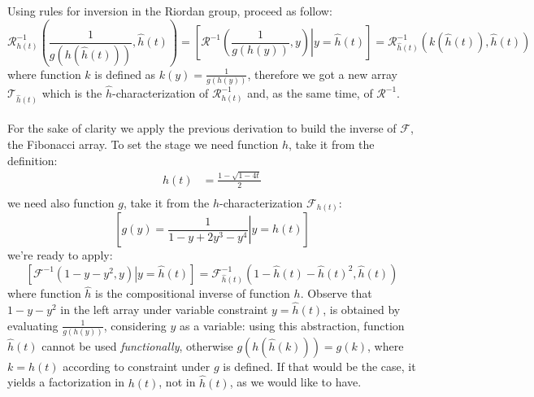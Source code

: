 Using rules for inversion in the Riordan group, 
proceed as follow:
\begin{displaymath}
    \mathcal{R}_{h(t)}^{-1}\left(\frac{1}{g(h(\hat{h}(t)))},\hat{h}(t)\right)=
    \left[\mathcal{R}^{-1}\left(\left.\frac{1}{g(h(y))},y\right) \right| y = \hat{h}(t) \right]=
    \mathcal{R}_{\hat{h}(t)}^{-1}\left(k(\hat{h}(t)),\hat{h}(t)\right)
\end{displaymath}
where function $k$ is defined as $k(y)=\frac{1}{g(h(y))}$, 
therefore we got a new array $\mathcal{T}_{\hat{h}(t)}$ which is the $\hat{h}$-characterization
of $\mathcal{R}_{h(t)}^{-1}$ and, as the same time, of $\mathcal{R}^{-1}$.
\\\\
For the sake of clarity we apply the previous derivation to build the inverse of $\mathcal{F}$,
the Fibonacci array.  To set the stage we need function $h$, take it from the definition:
\begin{displaymath}
    \begin{split}
        h(t)&=\frac{1-\sqrt{1-4t}}{2}\\
    \end{split}
\end{displaymath}
we need also function $g$, take it from the $h$-characterization $\mathcal{F}_{h(t)}$:
\begin{displaymath}
    \left[g(y)=\left.\frac{1}{1-y+2y^3-y^4} \right| y=h(t)\right]
\end{displaymath}
we're ready to apply:
\begin{displaymath}
    \left[\mathcal{F}^{-1}\left.\left(1-y-y^2,y\right) \right| y = \hat{h}(t) \right]=
    \mathcal{F}_{\hat{h}(t)}^{-1}\left(1-\hat{h}(t)-\hat{h}(t)^2,\hat{h}(t)\right)
\end{displaymath}
where function $\hat{h}$ is the compositional inverse of function $h$. Observe
that $1-y-y^2$ in the left array under variable constraint $y=\hat{h}(t)$, is
obtained by evaluating $\frac{1}{g(h(y))}$, considering $y$ as a variable:
using this abstraction, function $\hat{h}(t)$ cannot be used
\emph{functionally}, otherwise $g(h(\hat{h}(k)))=g(k)$, where $k=h(t)$
according to constraint under $g$ is defined. If that would be the case, it
yields a factorization in $h(t)$, not in $\hat{h}(t)$, as we would like to
have.

